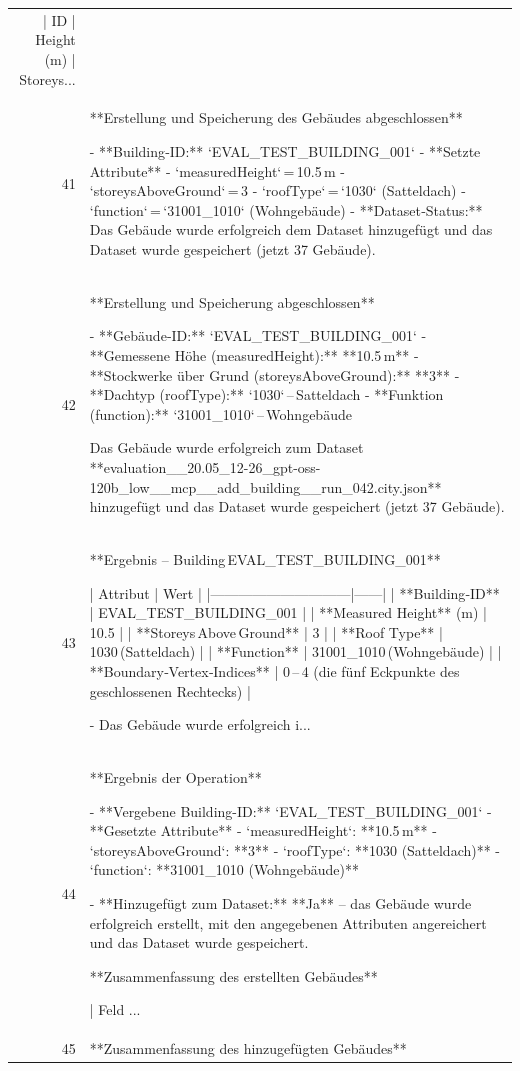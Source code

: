 \documentclass[a4paper,11pt]{article}
\begin{document}
\begin{table}[ht]
\begin{tabular}{r p{12cm}}
| ID | Height (m) | Storeys... \\
41 & **Erstellung und Speicherung des Gebäudes abgeschlossen**

- **Building‑ID:** `EVAL\_TEST\_BUILDING\_001`  
- **Setzte Attribute**  
  - `measuredHeight` = 10.5 m  
  - `storeysAboveGround` = 3  
  - `roofType` = `1030` (Satteldach)  
  - `function` = `31001\_1010` (Wohngebäude)  
- **Dataset‑Status:** Das Gebäude wurde erfolgreich dem Dataset hinzugefügt und das Dataset wurde gespeichert (jetzt 37 Gebäude). \\
42 & **Erstellung und Speicherung abgeschlossen**

- **Gebäude‑ID:** `EVAL\_TEST\_BUILDING\_001`  
- **Gemessene Höhe (measuredHeight):** **10.5 m**  
- **Stockwerke über Grund (storeysAboveGround):** **3**  
- **Dachtyp (roofType):** `1030` – Satteldach  
- **Funktion (function):** `31001\_1010` – Wohngebäude  

Das Gebäude wurde erfolgreich zum Dataset **evaluation\_\_20.05\_12-26\_gpt-oss-120b\_low\_\_mcp\_\_add\_building\_\_run\_042.city.json** hinzugefügt und das Dataset wurde gespeichert (jetzt 37 Gebäude). \\
43 & **Ergebnis – Building EVAL\_TEST\_BUILDING\_001**

| Attribut                     | Wert |
|------------------------------|------|
| **Building‑ID**              | EVAL\_TEST\_BUILDING\_001 |
| **Measured Height** (m)      | 10.5 |
| **Storeys Above Ground**     | 3 |
| **Roof Type**                | 1030 (Satteldach) |
| **Function**                 | 31001\_1010 (Wohngebäude) |
| **Boundary‑Vertex‑Indices**  | 0 – 4 (die fünf Eckpunkte des geschlossenen Rechtecks) |

- Das Gebäude wurde erfolgreich i... \\
44 & **Ergebnis der Operation**

- **Vergebene Building-ID:** `EVAL\_TEST\_BUILDING\_001`  
- **Gesetzte Attribute**  
  - `measuredHeight`: **10.5 m**  
  - `storeysAboveGround`: **3**  
  - `roofType`: **1030 (Satteldach)**  
  - `function`: **31001\_1010 (Wohngebäude)**  

- **Hinzugefügt zum Dataset:** **Ja** – das Gebäude wurde erfolgreich erstellt, mit den angegebenen Attributen angereichert und das Dataset wurde gespeichert.  

**Zusammenfassung des erstellten Gebäudes**  

| Feld                 ... \\
45 & **Zusammenfassung des hinzugefügten Gebäudes**


\end{tabular}
\end{table}
\end{document}
